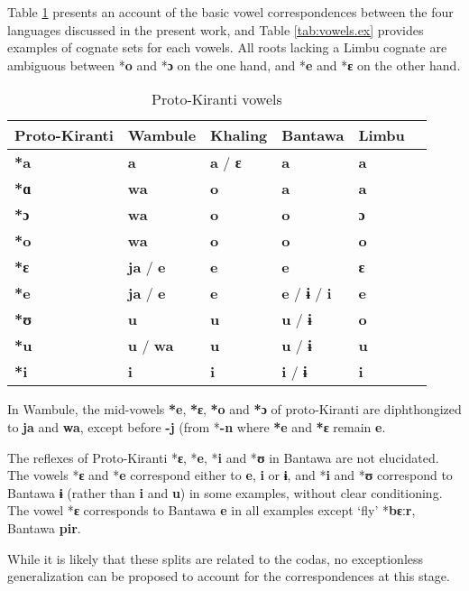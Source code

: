 \documentclass[oldfontcommands,oneside,a4paper,11pt]{article}
\newcommand{\ipa}[1]{\textbf{{\phon\mbox{#1}}}} %
\begin{document}
Table \ref{tab:vowels} presents an account of the basic vowel correspondences between the four languages discussed in the present work, and Table \ref{tab:vowels.ex} provides examples of cognate sets for each vowels. All roots lacking a Limbu cognate are ambiguous between *\ipa{o} and *\ipa{ɔ} on the one hand, and *\ipa{e} and *\ipa{ɛ} on the other hand.



\begin{table}[H]
\caption{Proto-Kiranti vowels} \centering \label{tab:vowels}
\begin{tabular}{llllll}
\toprule
Proto-Kiranti & Wambule & Khaling & Bantawa & Limbu \\
\midrule
\ipa{*a} & \ipa{a} & \ipa{a}  / \ipa{ɛ} & \ipa{a} & \ipa{a}  \\
\ipa{*ɑ} & \ipa{wa} & \ipa{o} & \ipa{a} & \ipa{a}  \\
\ipa{*ɔ} & \ipa{wa} & \ipa{o} & \ipa{o} & \ipa{ɔ}  \\
\ipa{*o} & \ipa{wa} & \ipa{o} & \ipa{o} & \ipa{o}  \\
\ipa{*ɛ} & \ipa{ja} /  \ipa{e} & \ipa{e} & \ipa{e}  & \ipa{ɛ}  \\
\ipa{*e} & \ipa{ja} /  \ipa{e}  & \ipa{e} & \ipa{e}  / \ipa{ɨ} / \ipa{i} & \ipa{e}    \\
\ipa{*ʊ} & \ipa{u} & \ipa{u} & \ipa{u}  /  \ipa{ɨ}  & \ipa{o} \\
\ipa{*u} & \ipa{u} / \ipa{wa} & \ipa{u} & \ipa{u} /  \ipa{ɨ} \  & \ipa{u} \\
\ipa{*i} & \ipa{i} & \ipa{i} & \ipa{i}  / \ipa{ɨ} & \ipa{i}  \\
\bottomrule
\end{tabular}
\end{table}

In Wambule, the mid-vowels \ipa{*e}, \ipa{*ɛ}, \ipa{*o} and \ipa{*ɔ} of proto-Kiranti are diphthongized to \ipa{ja} and \ipa{wa}, except before \ipa{-j} (from *\ipa{-n} where \ipa{*e} and \ipa{*ɛ} remain \ipa{e}. 

The reflexes of Proto-Kiranti *\ipa{ɛ}, *\ipa{e}, *\ipa{i} and *\ipa{ʊ} in Bantawa are not elucidated. The vowels *\ipa{ɛ} and *\ipa{e} correspond either to \ipa{e}, \ipa{i} or \ipa{ɨ}, and *\ipa{i} and *\ipa{ʊ} correspond to Bantawa \ipa{ɨ} (rather than \ipa{i} and \ipa{u}) in some examples, without clear conditioning. The vowel *\ipa{ɛ} corresponds to Bantawa \ipa{e} in all examples except `fly' *\ipa{bɛːr}, Bantawa \ipa{pir}.

While it is likely that these splits are related to the codas, no exceptionless generalization can be proposed to account for the correspondences at this stage.
 
\end{document}
